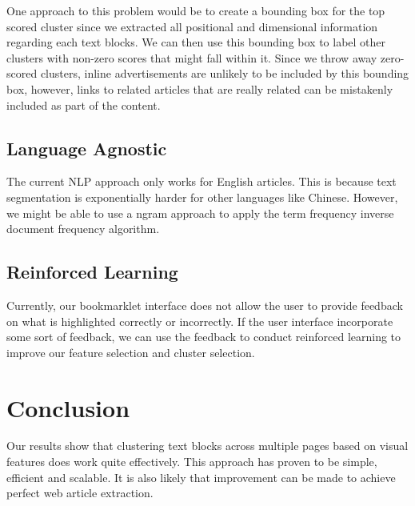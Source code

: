 \documentclass{acm_proc_article-sp}
\begin{document}
One approach to this problem would be to create a bounding box for the top scored cluster since we extracted all positional and dimensional information regarding each text blocks. We can then use this bounding box to label other clusters with non-zero scores that might fall within it. Since we throw away zero-scored clusters, inline advertisements are unlikely to be included by this bounding box, however, links to related articles that are really related can be mistakenly included as part of the content.

\subsection{Language Agnostic}

The current NLP approach only works for English articles. This is because text segmentation is exponentially harder for other languages like Chinese. However, we might be able to use a ngram approach to apply the term frequency inverse document frequency algorithm.

\subsection{Reinforced Learning}

Currently, our bookmarklet interface does not allow the user to provide feedback on what is highlighted correctly or incorrectly. If the user interface incorporate some sort of feedback, we can use the feedback to conduct reinforced learning to improve our feature selection and cluster selection.

\section{Conclusion}
Our results show that clustering text blocks across multiple pages based on visual features does work quite effectively. This approach has proven to be simple, efficient and scalable. It is also likely that improvement can be made to achieve perfect web article extraction.



\end{document}
